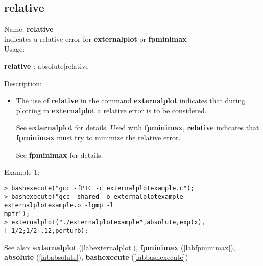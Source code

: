 \subsection{relative}
\label{labrelative}
\noindent Name: \textbf{relative}\\
indicates a relative error for \textbf{externalplot} or \textbf{fpminimax}\\
\noindent Usage: 
\begin{center}
\textbf{relative} : \textsf{absolute$|$relative}\\
\end{center}
\noindent Description: \begin{itemize}

\item The use of \textbf{relative} in the command \textbf{externalplot} indicates that during
   plotting in \textbf{externalplot} a relative error is to be considered.
    
   See \textbf{externalplot} for details.
   Used with \textbf{fpminimax}, \textbf{relative} indicates that \textbf{fpminimax} must try to minimize
   the relative error.
    
   See \textbf{fpminimax} for details.
\end{itemize}
\noindent Example 1: 
\begin{center}\begin{minipage}{15cm}\begin{Verbatim}[frame=single]
> bashexecute("gcc -fPIC -c externalplotexample.c");
> bashexecute("gcc -shared -o externalplotexample externalplotexample.o -lgmp -l
mpfr");
> externalplot("./externalplotexample",absolute,exp(x),[-1/2;1/2],12,perturb);
\end{Verbatim}
\end{minipage}\end{center}
See also: \textbf{externalplot} (\ref{labexternalplot}), \textbf{fpminimax} (\ref{labfpminimax}), \textbf{absolute} (\ref{lababsolute}), \textbf{bashexecute} (\ref{labbashexecute})
